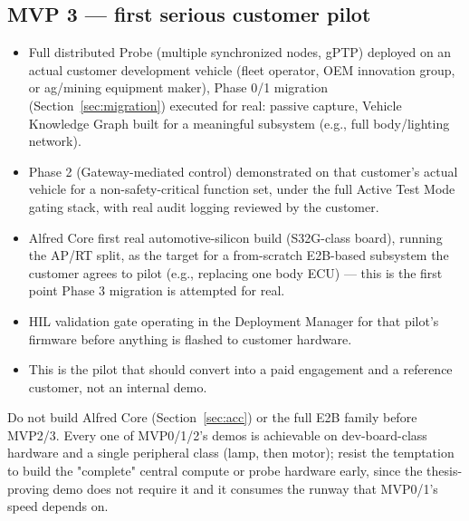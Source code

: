 \subsection{MVP 3 --- first serious customer pilot}

\begin{itemize}
\item Full distributed Probe (multiple synchronized nodes, gPTP) deployed on an actual customer development vehicle (fleet operator, OEM innovation group, or ag/mining equipment maker), Phase 0/1 migration (Section~\ref{sec:migration}) executed for real: passive capture, Vehicle Knowledge Graph built for a meaningful subsystem (e.g., full body/lighting network).
\item Phase 2 (Gateway-mediated control) demonstrated on that customer's actual vehicle for a non-safety-critical function set, under the full Active Test Mode gating stack, with real audit logging reviewed by the customer.
\item Alfred Core first real automotive-silicon build (S32G-class board), running the AP/RT split, as the target for a from-scratch E2B-based subsystem the customer agrees to pilot (e.g., replacing one body ECU) --- this is the first point Phase 3 migration is attempted for real.
\item HIL validation gate operating in the Deployment Manager for that pilot's firmware before anything is flashed to customer hardware.
\item This is the pilot that should convert into a paid engagement and a reference customer, not an internal demo.
\end{itemize}

\begin{decision}[title={Sequencing discipline}]
Do not build Alfred Core (Section~\ref{sec:acc}) or the full E2B family before MVP2/3. Every one of MVP0/1/2's demos is achievable on dev-board-class hardware and a single peripheral class (lamp, then motor); resist the temptation to build the "complete" central compute or probe hardware early, since the thesis-proving demo does not require it and it consumes the runway that MVP0/1's speed depends on.
\end{decision}
